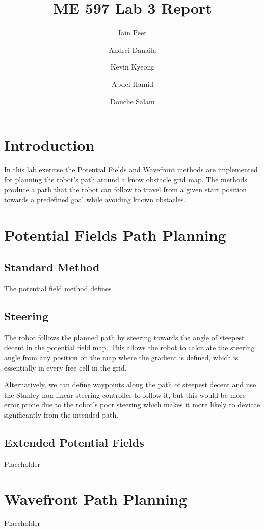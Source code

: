 \documentclass[11pt]{article} %
\title{ME 597 Lab 3 Report}
\author{Iain Peet \and Andrei Danaila \and Kevin Kyeong \and Abdel Hamid \and Douche Salam}
\begin{document}
\maketitle

\clearpage

\section{Introduction}
In this lab exercise the Potential Fields and Wavefront methods are implemented for planning the robot's path around a know obstacle grid map. The methods produce a path that the robot can follow to travel from a given start position towards a predefined goal while avoiding known obstacles.

\section{Potential Fields Path Planning}
\subsection{Standard Method}
The potential field method defines 

\subsection{Steering}
The robot follows the planned path by steering towards the angle of steepest decent in the potential field map. This allows the robot to calculate the steering angle from any position on the map where the gradient is defined, which is essentially in every free cell in the grid.

Alternatively, we can define waypoints along the path of steepest decent and use the Stanley non-linear steering controller to follow it, but this would be more error prone due to the robot's poor steering which makes it more likely to deviate significantly from the intended path.

\subsection{Extended Potential Fields}
Placeholder

\section{Wavefront Path Planning}
Placeholder
\end{document}
